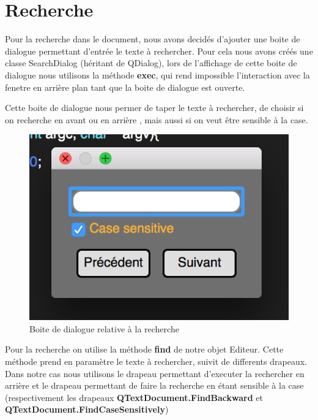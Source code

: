 \documentclass[a4paper,12pt]{article}
\begin{document}
	\newpage{}
\section{Recherche}

	Pour la recherche dans le document, nous avons decidés d'ajouter une boite de dialogue permettant d'entrée le texte à rechercher. Pour cela nous avons créés une classe SearchDialog (héritant de QDialog), lors de l'affichage de cette boite de dialogue nous utilisons la méthode \textbf{exec}, qui rend impossible l'interaction avec la fenetre en arrière plan tant que la boite de dialogue est ouverte.

	Cette boite de dialogue nous permer de taper le texte à rechercher, de choisir si on recherche en avant ou en arrière , mais aussi si on veut être sensible à la case.

	\begin{figure}[h!]
		\begin{center}
			\includegraphics[scale=0.8]{imgs/boite_dialog_recherche}
			\caption{Boite de dialogue relative à la recherche}
		\end{center}
	\end{figure}

	Pour la recherche on utilise la méthode \textbf{find} de notre objet Editeur. Cette méthode prend en paramètre le texte à rechercher, suivit de differents drapeaux. Dans notre cas nous utilisons le drapeau permettant d'executer la rechercher en arrière et le drapeau permettant de faire la recherche en étant sensible à la case (respectivement les drapeaux \textbf{QTextDocument.FindBackward} et \textbf{QTextDocument.FindCaseSensitively})
\end{document}
